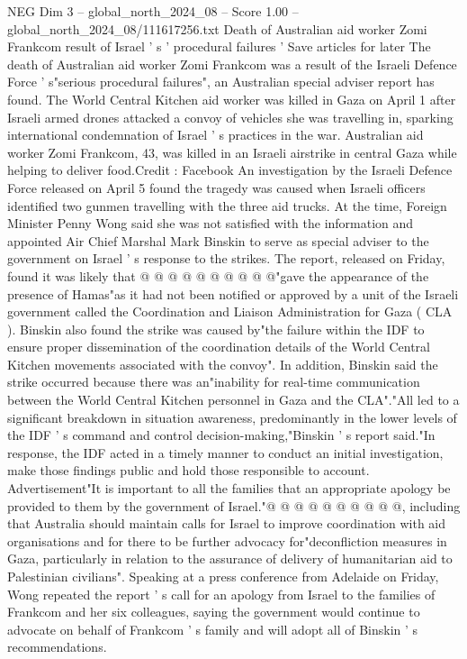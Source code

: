 \begin{textsample}{NEG Dim 3 – global\_north\_2024\_08 – Score 1.00 – global\_north\_2024\_08/111617256.txt}  \label{ex:f3_neg_319}
Death of Australian aid worker Zomi Frankcom result of Israel ' s ' procedural failures ' Save articles for later The death of Australian aid worker Zomi Frankcom was a result of the Israeli Defence Force ' s"serious procedural failures", an Australian special adviser report has found.
The World Central Kitchen aid worker was killed in Gaza on April 1 after Israeli armed drones attacked a convoy of vehicles she was travelling in, sparking international condemnation of Israel ' s practices in the war.
Australian aid worker Zomi Frankcom, 43, was killed in an Israeli airstrike in central Gaza while helping to deliver food.Credit : Facebook An investigation by the Israeli Defence Force released on April 5 found the tragedy was caused when Israeli officers identified two gunmen travelling with the three aid trucks.
At the time, Foreign Minister Penny Wong said she was not satisfied with the information and appointed Air Chief Marshal Mark Binskin to serve as special adviser to the government on Israel ' s response to the strikes.
The report, released on Friday, found it was likely that @ @ @ @ @ @ @ @ @ @"gave the appearance of the presence of Hamas"as it had not been notified or approved by a unit of the Israeli government called the Coordination and Liaison Administration for Gaza ( CLA ).
Binskin also found the strike was caused by"the failure within the IDF to ensure proper dissemination of the coordination details of the World Central Kitchen movements associated with the convoy".
In addition, Binskin said the strike occurred because there was an"inability for real-time communication between the World Central Kitchen personnel in Gaza and the CLA"."All led to a significant breakdown in situation awareness, predominantly in the lower levels of the IDF ' s command and control decision-making,"Binskin ' s report said."In response, the IDF acted in a timely manner to conduct an initial investigation, make those findings public and hold those responsible to account.
Advertisement"It is important to all the families that an appropriate apology be provided to them by the government of Israel."@ @ @ @ @ @ @ @ @ @, including that Australia should maintain calls for Israel to improve coordination with aid organisations and for there to be further advocacy for"deconfliction measures in Gaza, particularly in relation to the assurance of delivery of humanitarian aid to Palestinian civilians".
Speaking at a press conference from Adelaide on Friday, Wong repeated the report ' s call for an apology from Israel to the families of Frankcom and her six colleagues, saying the government would continue to advocate on behalf of Frankcom ' s family and will adopt all of Binskin ' s recommendations.

\end{textsample}
